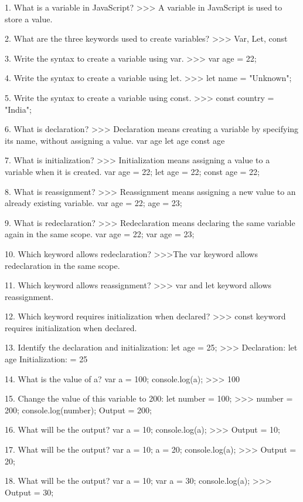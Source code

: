 1. What is a variable in JavaScript?
   >>> A variable in JavaScript is used to store a value.

2. What are the three keywords used to create variables?
    >>> Var, Let, const

3. Write the syntax to create a variable using var.
    >>> var age = 22;

4. Write the syntax to create a variable using let.
    >>> let name = "Unknown";

5. Write the syntax to create a variable using const.
    >>> const country = "India";

6. What is declaration?
    >>> Declaration means creating a variable by specifying its name, without assigning a value.
        var age
        let age
        const age

7. What is initialization?
    >>> Initialization means assigning a value to a variable when it is created.
        var age = 22;
        let age = 22;
        const age = 22;

8. What is reassignment?
    >>> Reassignment means assigning a new value to an already existing variable.
        var age = 22;
        age = 23;

9. What is redeclaration?
    >>> Redeclaration means declaring the same variable again in the same scope.
        var age = 22;
        var age = 23;

10. Which keyword allows redeclaration?
    >>>The var keyword allows redeclaration in the same scope.

11. Which keyword allows reassignment?
    >>> var and let keyword allows reassignment.

12. Which keyword requires initialization when declared?
    >>> const keyword requires initialization when declared.

13. Identify the declaration and initialization:
    let age = 25;
    >>> Declaration: let age
        Initialization: = 25

14. What is the value of a?
    var a = 100;
    console.log(a);
    >>> 100

15. Change the value of this variable to 200:
    let number = 100;
    >>> number = 200;
        console.log(number);
        Output = 200;

16. What will be the output?
    var a = 10;
    console.log(a);
    >>> Output = 10;

17. What will be the output?
    var a = 10;
    a = 20;
    console.log(a);
    >>> Output = 20;

18. What will be the output?
    var a = 10;
    var a = 30;
    console.log(a);
    >>> Output = 30;

